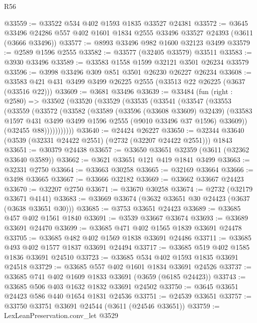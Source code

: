 \begin{lexlean}{R56}
\begin{coremodule}
@33559 := @33522 @534 @402 @1593 @1835 @33527 @24381
@33572 := @3645
    @33496
    @24286
    @557
    @402
    @1601
    @1834
    @2555
    @33496
    @33527
    @24393
    (@3611 (@3666 @33496))
@33577 := @8993 @33496 @982 @1600 @32123 @3499
@33579 := @2589 @1596 @2555
@33582 := @33577 (@32405 @33579) @33511
@33583 := @3930 @33496
@33589 := @33583 @1558 @1599 @32121 @3501 @26234 @33579
@33596 := @3998 @33496 @309 @851 @3501 @26230 @26227 @26234
@33608 := @33583 @421 @431 @3499 @3499 @26225 @2555 (@33513 @22 @26225 (@3637 (@33516 @22)))
@33609 := @3681 @33496
@33639 := @33484
    (fun (right : @2580) =>
    @33502
      (@33520
        (@33529
          (@33535
            (@33541
              (@33547
                (@33553
                  (@33559
                    (@33572
                      (@33582
                        (@33589
                          (@33596 (@33608 @33609) @32439)
                          (@33583
                            @1597
                            @431
                            @3499
                            @3499
                            @1596
                            @2555
                            (@9010 @33496 @37 @1596)
                            @33609))
                        (@32455 @88)))))))))))
@33640 := @24424 @26227
@33650 := @32344 @33640 (@3539 (@32331 @24422 @2551) (@2732 (@32207 @24422 @2551))) @1843
@33651 := @30379 @24438
@33657 := @33650 @33651 @32359 (@3611 (@32362 @33640 @3589))
@33662 := @3621 @33651 @121 @419 @1841 @3499
@33663 := @32331 @2750
@33664 := @33663 @30258
@33665 := @32169 @33664
@33666 := @3498 @33665
@33667 := @33666 @32182
@33669 := @33662 @33667 @24423
@33670 := @32207 @2750
@33671 := @33670 @30258
@33674 := @2732 (@32179 @33671 @4141)
@33683 := @33669 @33674 (@3632 @33651 @30 @24423 (@3637 (@3638 @33651 @30)))
@33685 := @3753 @33651 @24423
@33689 := @33685 @457 @402 @1561 @1840
@33691 := @3539 @33667 @33674
@33693 := @33689 @33691 @24470
@33699 := @33685 @471 @402 @1565 @1839 @33691 @24478
@33705 := @33685 @482 @402 @1569 @1838 @33691 @24486
@33711 := @33685 @493 @402 @1577 @1837 @33691 @24494
@33717 := @33685 @519 @402 @1585 @1836 @33691 @24510
@33723 := @33685 @534 @402 @1593 @1835 @33691 @24518
@33729 := @33685 @557 @402 @1601 @1834 @33691 @24526
@33737 := @33685 @741 @402 @1609 @1833 @33691 (@3659 (@6185 @24423))
@33743 := @33685 @506 @403 @1632 @1832 @33691 @24502
@33750 := @3645 @33651 @24423 @586 @440 @1654 @1831 @24536
@33751 := @24539 @33651
@33757 := @33750 @33751 @33691 @24544 (@3611 (@24546 @33651))
@33759 := LexLeanPreservation.conv_let @3529

\end{coremodule}
\end{lexlean}
